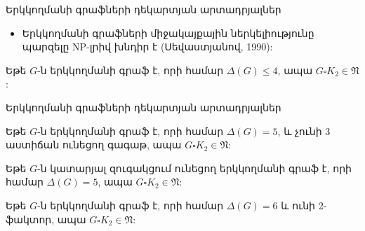 \begin{frame}{Երկկողմանի գրաֆների դեկարտյան արտադրյալներ}
\begin{itemize}
\item Երկկողմանի գրաֆների միջակայքային ներկելիությունը պարզելը NP-լրիվ խնդիր է (Սեվաստյանով, 1990): 

\end{itemize}

\begin{theorem}[2.3.3]
Եթե $G$-ն երկկողմանի գրաֆ է, որի համար $\Delta(G)\leq
4$, ապա $G\square K_{2}\in \mathfrak{N}$:
\end{theorem}
\end{frame}

\begin{frame}{Երկկողմանի գրաֆների դեկարտյան արտադրյալներ}

\begin{theorem}[2.3.5]
Եթե $G$-ն երկկողմանի գրաֆ է, որի համար $\Delta(G) =
5$, և չունի $3$ աստիճան ունեցող գագաթ, ապա $G\square K_{2}\in \mathfrak{N}$:
\end{theorem}

\begin{theorem}[2.3.7]
Եթե $G$-ն կատարյալ զուգակցում ունեցող երկկողմանի գրաֆ է, որի համար $\Delta(G)=5$, ապա $G \square K_2 \in \mathfrak{N}$:
\end{theorem}


\begin{theorem}[2.3.9]
Եթե $G$-ն երկկողմանի գրաֆ է, որի համար $\Delta(G)=6$ և ունի 2-ֆակտոր, ապա $G \square K_2 \in \mathfrak{N}$:
\end{theorem}
\end{frame}